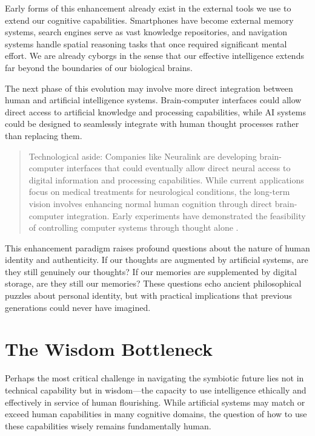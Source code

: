 Early forms of this enhancement already exist in the external tools we use to extend our cognitive capabilities. Smartphones have become external memory systems, search engines serve as vast knowledge repositories, and navigation systems handle spatial reasoning tasks that once required significant mental effort. We are already cyborgs in the sense that our effective intelligence extends far beyond the boundaries of our biological brains.

The next phase of this evolution may involve more direct integration between human and artificial intelligence systems. Brain-computer interfaces could allow direct access to artificial knowledge and processing capabilities, while AI systems could be designed to seamlessly integrate with human thought processes rather than replacing them.

\begin{quote}\small
Technological aside: Companies like Neuralink are developing brain-computer interfaces that could eventually allow direct neural access to digital information and processing capabilities. While current applications focus on medical treatments for neurological conditions, the long-term vision involves enhancing normal human cognition through direct brain-computer integration. Early experiments have demonstrated the feasibility of controlling computer systems through thought alone \parencite{neuralink2021progress}.
\end{quote}

This enhancement paradigm raises profound questions about the nature of human identity and authenticity. If our thoughts are augmented by artificial systems, are they still genuinely our thoughts? If our memories are supplemented by digital storage, are they still our memories? These questions echo ancient philosophical puzzles about personal identity, but with practical implications that previous generations could never have imagined.

\section{The Wisdom Bottleneck}

Perhaps the most critical challenge in navigating the symbiotic future lies not in technical capability but in wisdom—the capacity to use intelligence ethically and effectively in service of human flourishing. While artificial systems may match or exceed human capabilities in many cognitive domains, the question of how to use these capabilities wisely remains fundamentally human.

